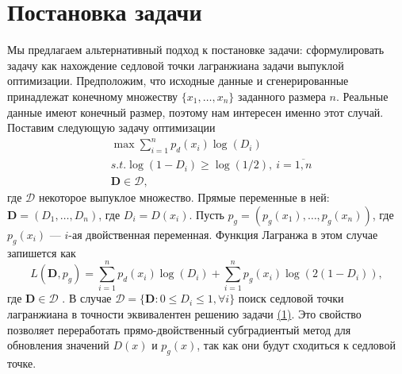 \documentclass[preprint,12pt]{elsarticle}
\begin{document}
\section{Постановка задачи}
\label{S:2}
Мы предлагаем альтернативный подход к постановке задачи: сформулировать задачу как нахождение седловой точки лагранжиана задачи выпуклой оптимизации. Предположим, что исходные данные и сгенерированные принадлежат конечному множеству $\{x_1, \ldots , x_n \} $ заданного размера $n$. Реальные данные имеют конечный размер, поэтому нам интересен именно этот случай. Поставим следующую задачу оптимизации
\begin{align*}
& \max \sum \limits _{i=1}^n p_d (x_i) \log (D_i) \\
& s.t. \log (1 -D_i) \geq \log (1/2) , \ i = \overline{1,n} \\
& \mathbf{D} \in \mathcal{D} ,
\end{align*}
где $ \mathcal{D} $ некоторое выпуклое множество. Прямые переменные в ней: $ \mathbf{D} = (D_1, \ldots , D_n) $, где $D_i = D(x_i)$. Пусть $p_g = (p_g (x_1), \ldots , p_g (x_n) )$, где $p_g (x_i) $ — $i$-ая двойственная переменная. Функция Лагранжа в этом случае запишется как
\begin{equation}
L(\mathbf{D}, p_g ) = \sum \limits _{i =1}^n p_d (x_i) \log (D_i) + \sum \limits_{i =1} ^n p_g (x_i) \log (2(1-D_i)),
\end{equation}
где $\mathbf{D} \in \mathcal{D}$ . В случае $\mathcal{D} = \{ \mathbf{D} : 0 \leq D_i \leq 1 , \forall i \}$ поиск седловой точки лагранжиана в точности эквивалентен решению задачи \href{eq :1}{(1)}. Это свойство позволяет переработать прямо-двойственный субградиентый метод для обновления значений $D(x) $ и $p_g (x)$, так как они будут сходиться к седловой точке.
\end{document}
